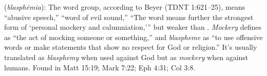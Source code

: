 \item[Blasphemy,]

(\textit{blasphēmia}):
The word group, according to Beyer (TDNT 1:621--25), means ``abusive speech,'' ``word of evil sound,'' ``The word means further the strongest form of `personal mockery and calumniation,''' but weaker than . \emph{Mockery} defines as ``the act of mocking someone or something,'' and \emph{blaspheme} as ``to use offensive words or make statements that show no respect for God or religion.'' It's usually translated as \emph{blasphemy} when used against God but as \emph{mockery} when against humans.
Found in Matt 15:19; Mark 7:22; Eph 4:31; Col 3:8.
